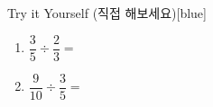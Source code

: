 \documentclass[12pt]{book}
\begin{document}
  \begin{flexbox}{Try it Yourself (직접 해보세요)}[blue]
  \begin{enumerate}
    \item $\dfrac{3}{5} \div \dfrac{2}{3}=$ \vspace*{20pt}
    \item $\dfrac{9}{10} \div \dfrac{3}{5}=$ \vspace*{20pt}
  \end{enumerate}
  \end{flexbox}
  


















\end{document}
